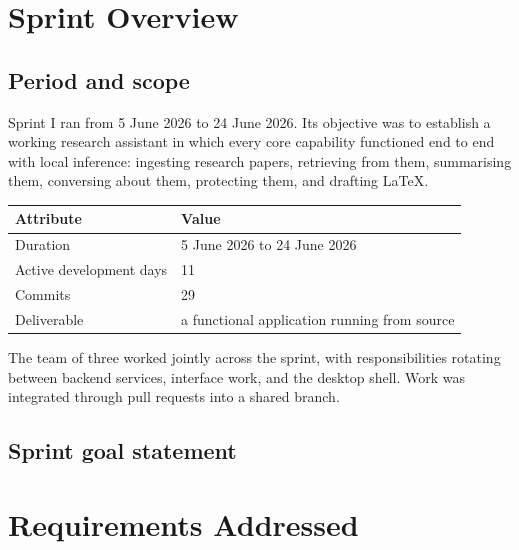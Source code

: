 \documentclass[11pt,a4paper]{article}
\begin{document}

\tableofcontents
\newpage

\section{Sprint Overview}

\subsection{Period and scope}

Sprint I ran from 5 June 2026 to 24 June 2026. Its objective was to establish a
working research assistant in which every core capability functioned end to end
with local inference: ingesting research papers, retrieving from them,
summarising them, conversing about them, protecting them, and drafting LaTeX.

\begin{center}
\small
\begin{tabular}{@{}ll@{}}
\toprule
\textbf{Attribute} & \textbf{Value} \\
\midrule
Duration & 5 June 2026 to 24 June 2026 \\
Active development days & 11 \\
Commits & 29 \\
Deliverable & a functional application running from source \\
\bottomrule
\end{tabular}
\end{center}

The team of three worked jointly across the sprint, with responsibilities
rotating between backend services, interface work, and the desktop shell. Work
was integrated through pull requests into a shared branch.

\subsection{Sprint goal statement}


\section{Requirements Addressed}
\end{document}
